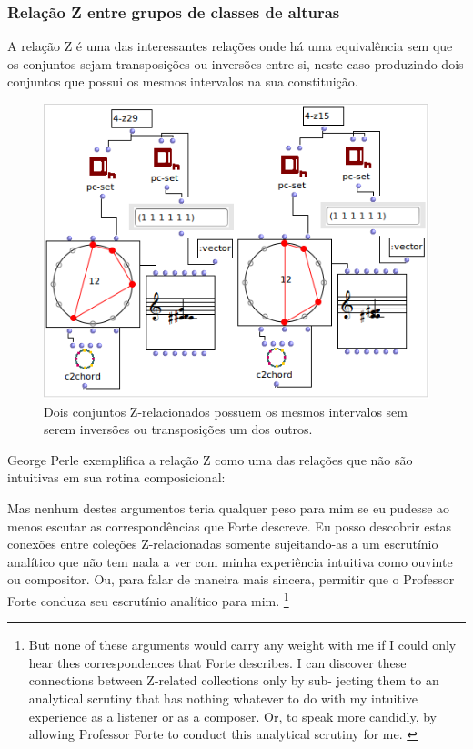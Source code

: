 \documentclass[
	12pt,				%
	openright,			%
	twoside,			%
	a4paper,			%
	english,			%
	french,				%
	spanish,			%
	brazil				%
	]{abntex2}
\begin{document}
\subsubsection{Relação Z entre grupos de classes de alturas}

A relação Z é uma das interessantes relações onde há uma equivalência sem que os conjuntos sejam transposições ou inversões entre si, neste caso produzindo dois conjuntos que possui os mesmos intervalos na sua constituição.


\begin{figure}[!h]
	\caption{\label{fig_grafico}Dois conjuntos Z-relacionados possuem os mesmos intervalos sem serem inversões ou transposições um dos outros. }
	\begin{center}
	    \includegraphics[scale=0.7]{OM_settheory/Z_related.png}
	\end{center}
\end{figure}


George Perle exemplifica a relação Z como uma das relações que não são intuitivas em sua rotina composicional:

\begin{citacao}
Mas nenhum destes argumentos teria qualquer peso para mim se eu pudesse ao menos escutar as correspondências que Forte descreve. Eu posso descobrir estas conexões entre coleções Z-relacionadas somente sujeitando-as a um escrutínio analítico que não tem nada a ver com minha experiência intuitiva como ouvinte ou compositor. Ou, para falar de maneira mais sincera, permitir que o Professor Forte conduza seu escrutínio analítico para mim.
\cite[p.168]{perle1990pitch}\footnote{
But none of these arguments would carry any weight with me if
I could only hear thes correspondences that Forte describes. I can
discover these connections between Z-related collections only by sub-
jecting them to an analytical scrutiny that has nothing whatever to do
with my intuitive experience as a listener or as a composer. Or, to
speak more candidly, by allowing Professor Forte to conduct this
analytical scrutiny for me. 
\cite[p.168]{perle1990pitch}}
\end{citacao}
\end{document}
